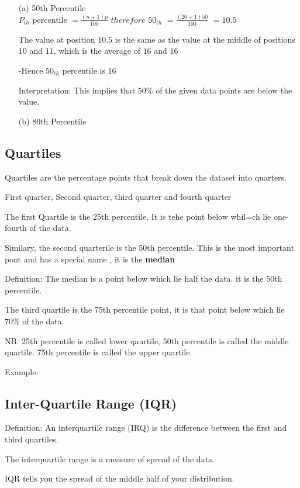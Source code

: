 \documentclass[12pt,a4paper]{article}
\begin{document}
\begin{enumerate}
    \item[(a)]50th Percentile \\ $P_{th}$ percentile $= \frac{(n + 1)p}{100}$
    $therefore$ $50_{th}$ $= \frac{(20 + 1)50}{100}$
    $= 10.5$

    The value at position $10.5$ is the same as the value at the middle of positions $10$ and $11$, which is the average of $16$ and $16$

    -Hence $50_{th}$ percentile is $16$

    Interpretation: This implies that $50\%$ of the given data points are below the value.
    \item[(b)] 80th Percentile
\end{enumerate}

\subsection{Quartiles}
Quartiles are the percentage points that break down the dataset into quarters.

First quarter, Second quarter, third quarter and fourth quarter

The first Quartile is the 25th percentile. It is tehe point below whil=ch lie one-fourth of the data.

Similary, the second quarterile is the 50th percentile. This is the most important pont and has a special name , it is the \textbf{median}

Definition: The median is a point below which lie half the data. it is the 50th percentile.

The third quartile is the 75th percentile point, it is that point below which lie $70\%$ of the data.

NB: 25th percentile is called lower qaurtile, 50th percentile is called the middle quartile. 75th percentile is called the upper quartile.

Example:

\subsection{Inter-Quartile Range (IQR)}
Definition: An interquartile range (IRQ) is the difference between the first and third quartiles.

The interquartile range is a measure of spread of the data.

IQR tells you the spread of the middle half of your distribution.
\end{document}
